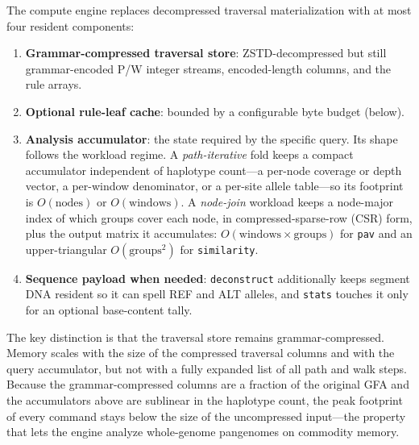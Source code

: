 The compute engine replaces decompressed traversal materialization with at most
four resident components:
\begin{enumerate}[noitemsep, topsep=2pt, leftmargin=*]
  \item \textbf{Grammar-compressed traversal store}: ZSTD-decompressed but still
        grammar-encoded P/W integer streams, encoded-length columns, and the
        rule arrays.
  \item \textbf{Optional rule-leaf cache}: bounded by a configurable byte
        budget (below).
  \item \textbf{Analysis accumulator}: the state required by the specific query.
        Its shape follows the workload regime. A \emph{path-iterative} fold keeps a
        compact accumulator independent of haplotype count---a per-node coverage or
        depth vector, a per-window denominator, or a per-site allele table---so its
        footprint is $O(\text{nodes})$ or $O(\text{windows})$. A \emph{node-join}
        workload keeps a node-major index of which groups cover each node, in
        compressed-sparse-row (CSR) form, plus the output matrix it accumulates:
        $O(\text{windows}\times\text{groups})$ for \texttt{pav} and an
        upper-triangular $O(\text{groups}^2)$ for \texttt{similarity}.
  \item \textbf{Sequence payload when needed}: \texttt{deconstruct} additionally
        keeps segment DNA resident so it can spell REF and ALT alleles, and
        \texttt{stats} touches it only for an optional base-content tally.
\end{enumerate}

The key distinction is that the traversal store remains grammar-compressed. Memory
scales with the size of the compressed traversal columns and with the query
accumulator, but not with a fully expanded list of all path and walk steps. Because
the grammar-compressed columns are a fraction of the original GFA and the
accumulators above are sublinear in the haplotype count, the peak footprint of every
command stays below the size of the uncompressed input---the property that lets the
engine analyze whole-genome pangenomes on commodity memory.

